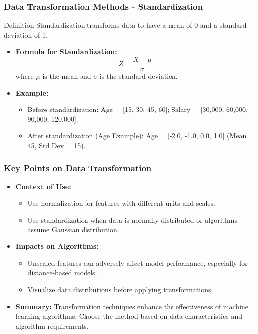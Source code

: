 \documentclass{beamer}
\begin{document}
\begin{frame}[fragile]
    \frametitle{Data Transformation Methods - Standardization}
    \begin{block}{Definition}
        Standardization transforms data to have a mean of 0 and a standard deviation of 1.
    \end{block}
    
    \begin{itemize}
        \item \textbf{Formula for Standardization:}
        \begin{equation}
            Z = \frac{X - \mu}{\sigma}
        \end{equation}
        where $\mu$ is the mean and $\sigma$ is the standard deviation.
        
        \item \textbf{Example:}
        \begin{itemize}
            \item Before standardization: Age = [15, 30, 45, 60]; Salary = [30,000, 60,000, 90,000, 120,000].
            \item After standardization (Age Example): Age = [-2.0, -1.0, 0.0, 1.0] (Mean = 45, Std Dev = 15).
        \end{itemize}
    \end{itemize}
\end{frame}

\begin{frame}[fragile]
    \frametitle{Key Points on Data Transformation}
    \begin{itemize}
        \item \textbf{Context of Use:}
        \begin{itemize}
            \item Use normalization for features with different units and scales.
            \item Use standardization when data is normally distributed or algorithms assume Gaussian distribution.
        \end{itemize}
        
        \item \textbf{Impacts on Algorithms:}
        \begin{itemize}
            \item Unscaled features can adversely affect model performance, especially for distance-based models.
            \item Visualize data distributions before applying transformations.
        \end{itemize}
        
        \item \textbf{Summary:} 
        Transformation techniques enhance the effectiveness of machine learning algorithms. Choose the method based on data characteristics and algorithm requirements.
    \end{itemize}
\end{frame}
\end{document}
